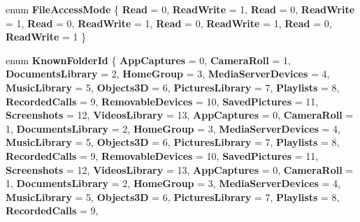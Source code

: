 \begin{DoxyCompactItemize}
\mbox{\label{namespace_windows_1_1_storage_a5692c3d5d5dc5255f90f05e0a6c3ae9e}} 
enum {\bfseries File\+Access\+Mode} \{ \newline
{\bfseries Read} = 0, 
{\bfseries Read\+Write} = 1, 
{\bfseries Read} = 0, 
{\bfseries Read\+Write} = 1, 
\newline
{\bfseries Read} = 0, 
{\bfseries Read\+Write} = 1, 
{\bfseries Read} = 0, 
{\bfseries Read\+Write} = 1, 
\newline
{\bfseries Read} = 0, 
{\bfseries Read\+Write} = 1
 \}
\item 
\mbox{\label{namespace_windows_1_1_storage_ad806137f79e39155cbf64fd8e1e6de11}} 
enum {\bfseries Known\+Folder\+Id} \{ \newline
{\bfseries App\+Captures} = 0, 
{\bfseries Camera\+Roll} = 1, 
{\bfseries Documents\+Library} = 2, 
{\bfseries Home\+Group} = 3, 
\newline
{\bfseries Media\+Server\+Devices} = 4, 
{\bfseries Music\+Library} = 5, 
{\bfseries Objects3D} = 6, 
{\bfseries Pictures\+Library} = 7, 
\newline
{\bfseries Playlists} = 8, 
{\bfseries Recorded\+Calls} = 9, 
{\bfseries Removable\+Devices} = 10, 
{\bfseries Saved\+Pictures} = 11, 
\newline
{\bfseries Screenshots} = 12, 
{\bfseries Videos\+Library} = 13, 
{\bfseries App\+Captures} = 0, 
{\bfseries Camera\+Roll} = 1, 
\newline
{\bfseries Documents\+Library} = 2, 
{\bfseries Home\+Group} = 3, 
{\bfseries Media\+Server\+Devices} = 4, 
{\bfseries Music\+Library} = 5, 
\newline
{\bfseries Objects3D} = 6, 
{\bfseries Pictures\+Library} = 7, 
{\bfseries Playlists} = 8, 
{\bfseries Recorded\+Calls} = 9, 
\newline
{\bfseries Removable\+Devices} = 10, 
{\bfseries Saved\+Pictures} = 11, 
{\bfseries Screenshots} = 12, 
{\bfseries Videos\+Library} = 13, 
\newline
{\bfseries App\+Captures} = 0, 
{\bfseries Camera\+Roll} = 1, 
{\bfseries Documents\+Library} = 2, 
{\bfseries Home\+Group} = 3, 
\newline
{\bfseries Media\+Server\+Devices} = 4, 
{\bfseries Music\+Library} = 5, 
{\bfseries Objects3D} = 6, 
{\bfseries Pictures\+Library} = 7, 
\newline
{\bfseries Playlists} = 8, 
{\bfseries Recorded\+Calls} = 9, 

\end{DoxyCompactItemize}
